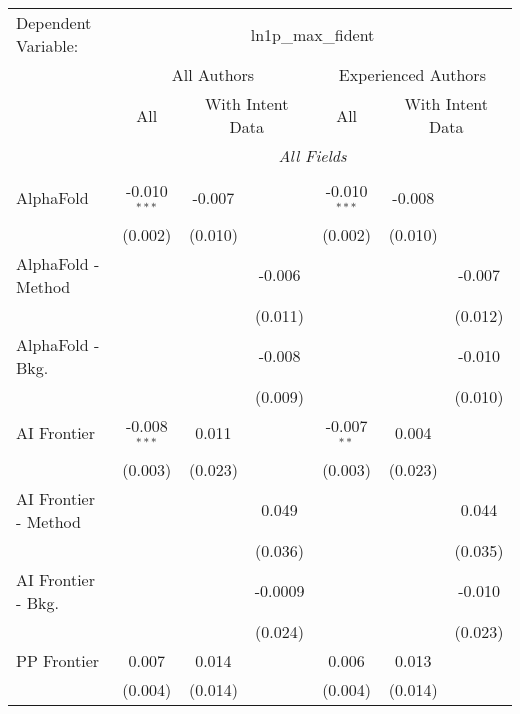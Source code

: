 \begingroup
\centering
\begin{tabular}{lcccccc}
   \tabularnewline \midrule \midrule
   Dependent Variable: & \multicolumn{6}{c}{ln1p\_max\_fident}\\
 & \multicolumn{3}{c}{All Authors} & \multicolumn{3}{c}{Experienced Authors} \\
\cmidrule(lr){2-4} \cmidrule(lr){5-7}
 & \multicolumn{1}{c}{All} & \multicolumn{2}{c}{With Intent Data} & \multicolumn{1}{c}{All} & \multicolumn{2}{c}{With Intent Data} \\
\cmidrule(lr){2-2} \cmidrule(lr){3-4} \cmidrule(lr){5-5} \cmidrule(lr){6-7}
 & \multicolumn{6}{c}{\textit{All Fields}} \\ \\
   AlphaFold            & -0.010$^{***}$ & -0.007  &         & -0.010$^{***}$ & -0.008  &   \\   
                        & (0.002)        & (0.010) &         & (0.002)        & (0.010) &   \\   
   AlphaFold - Method   &                &         & -0.006  &                &         & -0.007\\   
                        &                &         & (0.011) &                &         & (0.012)\\   
   AlphaFold - Bkg.     &                &         & -0.008  &                &         & -0.010\\   
                        &                &         & (0.009) &                &         & (0.010)\\   
   AI Frontier          & -0.008$^{***}$ & 0.011   &         & -0.007$^{**}$  & 0.004   &   \\   
                        & (0.003)        & (0.023) &         & (0.003)        & (0.023) &   \\   
   AI Frontier - Method &                &         & 0.049   &                &         & 0.044\\   
                        &                &         & (0.036) &                &         & (0.035)\\   
   AI Frontier - Bkg.   &                &         & -0.0009 &                &         & -0.010\\   
                        &                &         & (0.024) &                &         & (0.023)\\   
   PP Frontier          & 0.007          & 0.014   &         & 0.006          & 0.013   &   \\   
                        & (0.004)        & (0.014) &         & (0.004)        & (0.014) &   \\   

\end{tabular}
